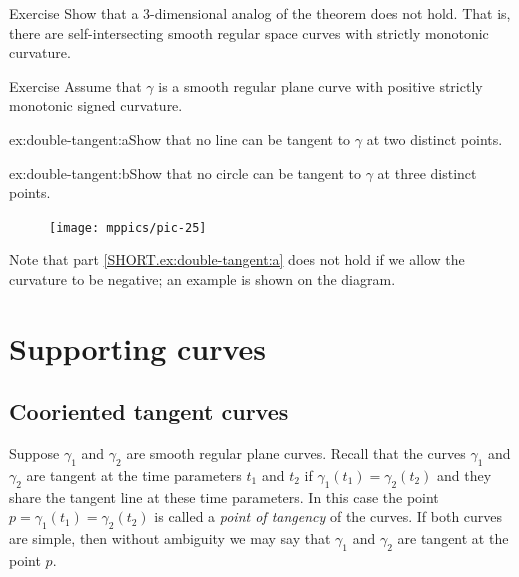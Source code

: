 \begin{thm}{Exercise}\label{ex:3D-spiral}
Show that a 3-dimensional analog of the theorem does not hold.
That is, there are self-intersecting smooth regular space curves with strictly monotonic curvature.
\end{thm}

\begin{thm}{Exercise}\label{ex:double-tangent}
Assume that $\gamma$ is a smooth regular plane curve with positive strictly monotonic signed curvature.

\begin{subthm}{ex:double-tangent:a}Show that no line can be tangent to $\gamma$ at two distinct points.
\end{subthm}

\begin{subthm}{ex:double-tangent:b}Show that no circle can be tangent to $\gamma$ at three distinct points. 
\end{subthm}

\end{thm}

{

\begin{figure}
\vskip-4mm
\centering
\texttt{[image: mppics/pic-25]}
\vskip0mm
\end{figure}

Note that part \ref{SHORT.ex:double-tangent:a} does not hold if we allow the curvature to be negative; an example is shown on the diagram.

}

\chapter{Supporting curves}

\section{Cooriented tangent curves}

Suppose $\gamma_1$ and $\gamma_2$ are smooth regular plane curves.
Recall that the curves $\gamma_1$ and $\gamma_2$ are tangent at the  time parameters $t_1$ and $t_2$
if $\gamma_1(t_1)=\gamma_2(t_2)$
and they share the tangent line at these time parameters.
In this case the point $p=\gamma_1(t_1)=\gamma_2(t_2)$ is called a \emph{point of tangency} of the curves.
If both curves are simple, then without ambiguity we may say that $\gamma_1$ and $\gamma_2$ are tangent at the point $p$.

